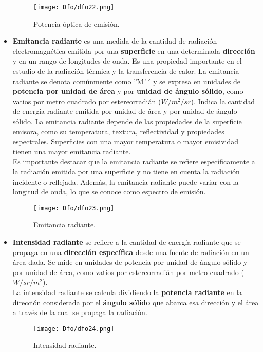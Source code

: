 \documentclass[
	12pt, %
	fleqn, %
	a4paper, %
	oneside, %
]{LegrandOrangeBook}
\begin{document}
\begin{itemize}
\begin{figure}[H]
\centering
\texttt{[image: Dfo/dfo22.png]}
\caption{Potencia óptica de emisión.}
\end{figure}

\item \textbf{Emitancia radiante} es una medida de la cantidad de radiación electromagnética emitida por una \textbf{superficie} en una determinada \textbf{dirección} y en un rango de longitudes de onda. Es una propiedad importante en el estudio de la radiación térmica y la transferencia de calor. La emitancia radiante se denota comúnmente como ''M´´ y se expresa en unidades de \textbf{potencia por unidad de área} y por \textbf{unidad de ángulo sólido}, como vatios por metro cuadrado por estereorradián ($W/m^2/sr$). Indica la cantidad de energía radiante emitida por unidad de área y por unidad de ángulo sólido. La emitancia radiante depende de las propiedades de la superficie emisora, como su temperatura, textura, reflectividad y propiedades espectrales. Superficies con una mayor temperatura o mayor emisividad tienen una mayor emitancia radiante.\\
Es importante destacar que la emitancia radiante se refiere específicamente a la radiación emitida por una superficie y no tiene en cuenta la radiación incidente o reflejada. Además, la emitancia radiante puede variar con la longitud de onda, lo que se conoce como espectro de emisión.
\begin{figure}[H]
\centering
\texttt{[image: Dfo/dfo23.png]}
\caption{Emitancia radiante.}
\end{figure}

\item \textbf{Intensidad radiante} se refiere a la cantidad de energía radiante que se propaga en una \textbf{dirección específica} desde una fuente de radiación en un área dada. Se mide en unidades de potencia por unidad de ángulo sólido y por unidad de área, como vatios por estereorradián por metro cuadrado ($W/sr/m^2$).\\
La intensidad radiante se calcula dividiendo la\textbf{ potencia radiante} en la dirección considerada por el \textbf{ángulo sólido} que abarca esa dirección y el área a través de la cual se propaga la radiación.
\begin{figure}[H]
\centering
\texttt{[image: Dfo/dfo24.png]}
\caption{Intensidad radiante.}
\end{figure}


\end{itemize}
\end{document}
